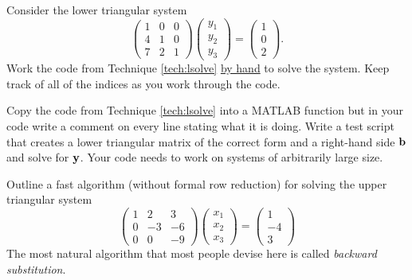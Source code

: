 \begin{problem}
    Consider the lower triangular system 
    \[ \begin{pmatrix} 1 & 0 & 0 \\ 4 & 1 & 0 \\ 7 & 2 & 1 \end{pmatrix} \begin{pmatrix}
        y_1 \\ y_2 \\ y_3 \end{pmatrix} = \begin{pmatrix} 1 \\ 0 \\ 2\end{pmatrix}. \]
    Work the code from Technique \ref{tech:lsolve} \underline{by hand} to solve the
    system.  Keep track of all of the indices as you work through the code.
\end{problem}

\begin{problem}
    Copy the code from Technique \ref{tech:lsolve} into a MATLAB function but in your code
    write a comment on every line stating what it is doing.  Write a test script that
    creates a lower triangular matrix of the correct form and a right-hand side ${\bf b}$ and
    solve for ${\bf y}$.  Your code needs to work on systems of arbitrarily large size.
\end{problem}

\begin{problem}
    Outline a fast algorithm (without formal row reduction) for solving the upper triangular system
    \[ \begin{pmatrix} 1 & 2 & 3 \\ 0 & -3 & -6 \\ 0 & 0 & -9 \end{pmatrix}
        \begin{pmatrix} x_1 \\ x_2 \\ x_3 \end{pmatrix} = \begin{pmatrix} 1 \\ -4 \\
        3\end{pmatrix} \]
    The most natural algorithm that most people devise here is called {\it backward
    substitution}.
\end{problem}

